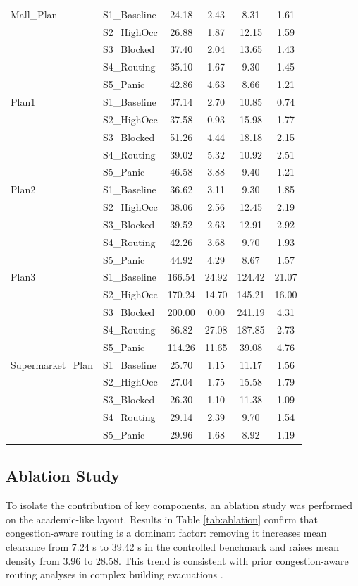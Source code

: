 \documentclass[journal]{IEEEtran}
\begin{document}
\begin{table}[t]
\begin{tabular}{llcccc}
\midrule
Mall\_Plan & S1\_Baseline & 24.18 & 2.43 & 8.31 & 1.61 \\
 & S2\_HighOcc & 26.88 & 1.87 & 12.15 & 1.59 \\
 & S3\_Blocked & 37.40 & 2.04 & 13.65 & 1.43 \\
 & S4\_Routing & 35.10 & 1.67 & 9.30 & 1.45 \\
 & S5\_Panic & 42.86 & 4.63 & 8.66 & 1.21 \\
\midrule
Plan1 & S1\_Baseline & 37.14 & 2.70 & 10.85 & 0.74 \\
 & S2\_HighOcc & 37.58 & 0.93 & 15.98 & 1.77 \\
 & S3\_Blocked & 51.26 & 4.44 & 18.18 & 2.15 \\
 & S4\_Routing & 39.02 & 5.32 & 10.92 & 2.51 \\
 & S5\_Panic & 46.58 & 3.88 & 9.40 & 1.21 \\
\midrule
Plan2 & S1\_Baseline & 36.62 & 3.11 & 9.30 & 1.85 \\
 & S2\_HighOcc & 38.06 & 2.56 & 12.45 & 2.19 \\
 & S3\_Blocked & 39.52 & 2.63 & 12.91 & 2.92 \\
 & S4\_Routing & 42.26 & 3.68 & 9.70 & 1.93 \\
 & S5\_Panic & 44.92 & 4.29 & 8.67 & 1.57 \\
\midrule
Plan3 & S1\_Baseline & 166.54 & 24.92 & 124.42 & 21.07 \\
 & S2\_HighOcc & 170.24 & 14.70 & 145.21 & 16.00 \\
 & S3\_Blocked & 200.00 & 0.00 & 241.19 & 4.31 \\
 & S4\_Routing & 86.82 & 27.08 & 187.85 & 2.73 \\
 & S5\_Panic & 114.26 & 11.65 & 39.08 & 4.76 \\
\midrule
Supermarket\_Plan & S1\_Baseline & 25.70 & 1.15 & 11.17 & 1.56 \\
 & S2\_HighOcc & 27.04 & 1.75 & 15.58 & 1.79 \\
 & S3\_Blocked & 26.30 & 1.10 & 11.38 & 1.09 \\
 & S4\_Routing & 29.14 & 2.39 & 9.70 & 1.54 \\
 & S5\_Panic & 29.96 & 1.68 & 8.92 & 1.19 \\
\bottomrule
\end{tabular}
\end{table}

\subsection{Ablation Study}
To isolate the contribution of key components, an ablation study was performed on the academic-like layout. Results in Table \ref{tab:ablation} confirm that congestion-aware routing is a dominant factor: removing it increases mean clearance from 7.24 s to 39.42 s in the controlled benchmark and raises mean density from 3.96 to 28.58. This trend is consistent with prior congestion-aware routing analyses in complex building evacuations \cite{ding2017}.
\end{document}
